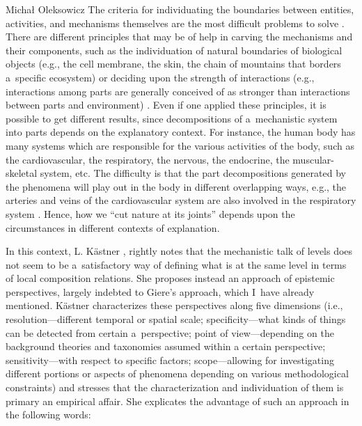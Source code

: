 \begin{artengenv}{Michał Oleksowicz}
The criteria for individuating the boundaries between entities, activities, and mechanisms themselves are the most difficult problems to solve
\parencite[][]{glennan_components_2017}. %
 There are different principles that may be of help in carving the mechanisms and their components, such as the individuation of natural boundaries of biological objects (e.g., the cell membrane, the skin, the chain of mountains that borders a~specific ecosystem) 
\parencite[][]{darden_thinking_2008} %
 or deciding upon the strength of interactions (e.g., interactions among parts are generally conceived of as stronger than interactions between parts and environment) 
\parencite[][]{wimsatt_complexity_1974}. %
 Even if one applied these principles, it is possible to get different results, since decompositions of a~mechanistic system into parts depends on the explanatory context. For instance, the human body has many systems which are responsible for the various activities of the body, such as the cardiovascular, the respiratory, the nervous, the endocrine, the muscular-skeletal system, etc. The difficulty is that the part decompositions generated by the phenomena will play out in the body in different overlapping ways, e.g., the arteries and veins of the cardiovascular system are also involved in the respiratory system 
\parencite[][pp.37–38]{glennan_components_2017}. %
 Hence, how we ``cut nature at its joints'' depends upon the circumstances in different contexts of explanation.

In this context, L. Kästner
\parencite*{kastner_integrating_2018}, %
rightly notes that the mechanistic talk of levels does not seem to be a~satisfactory way of defining what is at the same level in terms of local composition relations. She proposes instead an approach of epistemic perspectives, largely indebted to Giere's
\parencite*[][]{giere_scientific_2006} %
 approach, which I~have already mentioned. Kästner characterizes these perspectives along five dimensions (i.e., resolution---different temporal or spatial scale; specificity---what kinds of things can be detected from certain a~perspective; point of view---depending on the background theories and taxonomies assumed within a certain perspective; sensitivity---with respect to specific factors; scope---allowing for investigating different portions or aspects of phenomena depending on various methodological constraints) and stresses that the characterization and individuation of them is primary an empirical affair. She explicates the advantage of such an approach in the following words:


\end{artengenv}
